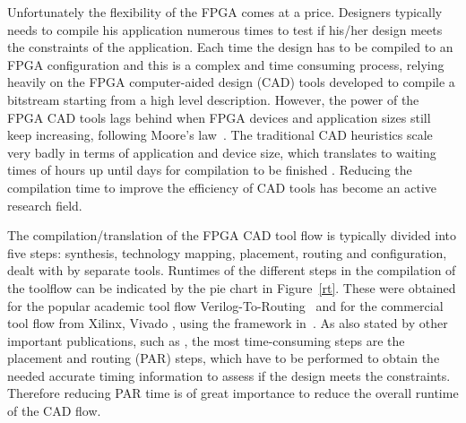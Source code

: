 \documentclass[a4paper,oneside,12pt]{article}
\begin{document}
Unfortunately the flexibility of the FPGA comes at a price. Designers typically needs to compile his application numerous times to test if his/her design meets the constraints of the application. Each time the design has to be compiled to an FPGA configuration and this is a complex and time consuming process, relying heavily on the FPGA computer-aided design (CAD) tools developed to compile a bitstream starting from a high level description.
However, the power of the FPGA CAD tools lags behind when FPGA devices and application sizes still keep increasing, following Moore's law~\cite{shannon2015technology}. The traditional CAD heuristics scale very badly in terms of application and device size, which translates to waiting times of hours up until days for compilation to be finished \cite{murray2015timing}.
Reducing the compilation time to improve the efficiency of CAD tools has become an active research field.

The compilation/translation of the FPGA CAD tool flow is typically divided into five steps: synthesis, technology mapping, placement, routing and configuration, dealt with by separate tools.  %
Runtimes of the different steps in the compilation of the toolflow can be indicated by the pie chart in Figure~\ref{rt}. These were obtained for the popular academic tool flow Verilog-To-Routing~\cite{luu2014vtr} and for the commercial tool flow from Xilinx, Vivado \cite{feist2012vivado}, using the framework in~\cite{vansteenkiste2015analyzing}. As also stated by other important publications, such as \cite{murray2015timing}, the most time-consuming steps are the placement and routing (PAR) steps, which have to be performed to obtain the needed accurate timing information to assess if the design meets the constraints.
Therefore reducing PAR time is of great importance to reduce the overall runtime of the CAD flow.

\end{document}
